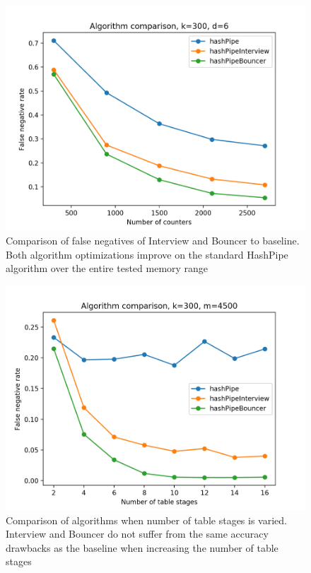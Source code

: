 \begin{figure}[t]
  \centering
    \includegraphics[scale=0.58]{algComparison}
     \caption{Comparison of false negatives of Interview and Bouncer to baseline. Both algorithm optimizations improve on the standard HashPipe algorithm over the entire tested memory range}
     \label{fig:bp-image}
\end{figure}

\begin{figure}[t]
  \centering
    \includegraphics[scale=0.58]{stageComparison}
     \caption{Comparison of algorithms when number of table stages is varied. Interview and Bouncer do not suffer from the same accuracy drawbacks as the baseline when increasing the number of table stages}
     \label{fig:bp-image}
\end{figure}